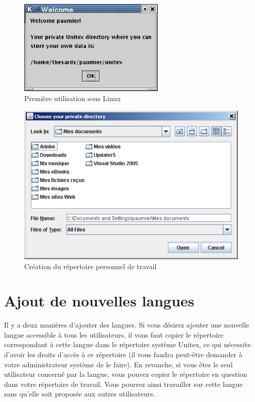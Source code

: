 \begin{figure}[!ht]
\begin{center}
\includegraphics[width=7cm]{resources/img/fig1-2.png}
\caption{Première utilisation sous Linux}
\end{center}
\end{figure}

\begin{figure}[!ht]
\begin{center}
\includegraphics[width=13cm]{resources/img/fig1-3.png}
\caption{Création du répertoire personnel de travail
\label{fig-creation-personal-directory}}
\end{center}
\end{figure}



\section{Ajout de nouvelles langues}

\bigskip
\noindent Il y a deux manières d’ajouter des langues. Si vous désirez ajouter une nouvelle langue
accessible à tous les utilisateurs, il vous faut copier le répertoire correspondant à cette langue
dans le répertoire système Unitex,
ce qui nécessite d’avoir les droits d’accès à ce répertoire
(il vous faudra peut-être demander à votre administrateur système de le faire).
En revanche, si vous êtes le seul utilisateur concerné par la langue, vous pouvez copier le répertoire
en question dans votre répertoire de travail.
Vous pourrez ainsi travailler sur cette langue sans qu’elle soit proposée aux autres utilisateurs.




